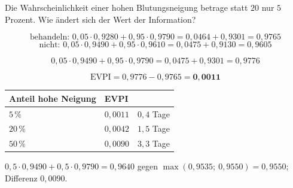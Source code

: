 \begin{aufgabe}
Die Wahrscheinlichkeit einer hohen Blutungsneigung betrage statt $20$ nur $5$ Prozent. Wie ändert sich der Wert der Information?

\loesung
{}
\[ \text{behandeln: } 0{,}05\cdot0{,}9280 + 0{,}95\cdot0{,}9790 = 0{,}0464+0{,}9301 = 0{,}9765 \]
\[ \text{nicht: } 0{,}05\cdot0{,}9490 + 0{,}95\cdot0{,}9610 = 0{,}0475+0{,}9130 = 0{,}9605 \]

\[ 0{,}05\cdot0{,}9490 + 0{,}95\cdot0{,}9790 = 0{,}0475+0{,}9301 = 0{,}9776 \]

\[ \text{EVPI} = 0{,}9776 - 0{,}9765 = \mathbf{0{,}0011} \]

\begin{center}
{\small
\renewcommand{\arraystretch}{1.48}
\begin{tabular}{@{}P{2.6cm}P{2.2cm}P{2.6cm}@{}}
\toprule
\textbf{Anteil hohe Neigung} & \textbf{EVPI} & \\
\midrule
$5\,\%$ & $0{,}0011$ & $0{,}4$ Tage\\
$20\,\%$ & $0{,}0042$ & $1{,}5$ Tage\\
$50\,\%$ & $0{,}0090$ & $3{,}3$ Tage\\
\bottomrule
\end{tabular}}
\end{center}

 $0{,}5\cdot0{,}9490+0{,}5\cdot0{,}9790 = 0{,}9640$ gegen $\max(0{,}9535;\ 0{,}9550) = 0{,}9550$; Differenz $0{,}0090$.

\begin{center}
\begin{minipage}{0.88\textwidth}
\end{minipage}
\end{center}
\end{aufgabe}

